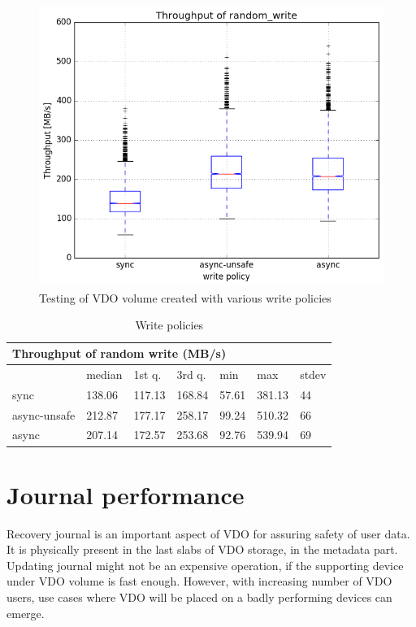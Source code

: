 \documentclass[
  color, %
  table, %
  lof,   %
  lot,   %
]{fithesis3}
\begin{document}
\begin{figure}[!htb]
        \centering
        \includegraphics[width=\textwidth]{../results/write_policies/report/random_write1_compare_boxplots}
\caption[write policies]{Testing of VDO volume created with various write policies}
\label{fig:writepolicies}
\end{figure}

\begin{table}
\begin{tabular}{|l|l|l|l|l|l|l|}
        \hline
        \multicolumn{7}{|l|}{Throughput of random write (MB/s)} \\ \hline
         & median & 1st q. & 3rd q. & min & max & stdev \\ \hline 
sync & 138.06 & 117.13 & 168.84 & 57.61 & 381.13 & 44 \\ \hline
async-unsafe & 212.87 & 177.17 & 258.17 & 99.24 & 510.32 & 66 \\ \hline
async & 207.14 & 172.57 & 253.68 & 92.76 & 539.94 & 69 \\ \hline
\end{tabular}
\caption{Write policies}
\label{tab:writepolicies}
\end{table}

\section{Journal performance}
Recovery journal is an important aspect of VDO for assuring safety of user data. It is physically present in the last slabs of VDO storage, in the metadata part. Updating journal might not be an expensive operation, if the supporting device under VDO volume is fast enough. However, with increasing number of VDO users, use cases where VDO will be placed on a badly performing devices can emerge.
\end{document}
